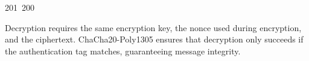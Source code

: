 201~200~\documentclass{article}
\begin{document}
	                                                                                                                                                                                                                                                                                                	                                                                                                                                        	    	                                                                                                	                                                                                                                                                                                                                                                                                                                                	                                                                        	                                                                        	                                                                                                                                        	                                                                                                                                                                                                                        	                                                                                                                            	                                                                	                                                                                                                                            Decryption requires the same encryption key, the nonce used during encryption, and the ciphertext. ChaCha20-Poly1305 ensures that decryption only succeeds if the authentication tag matches, guaranteeing message integrity.
\end{document}
